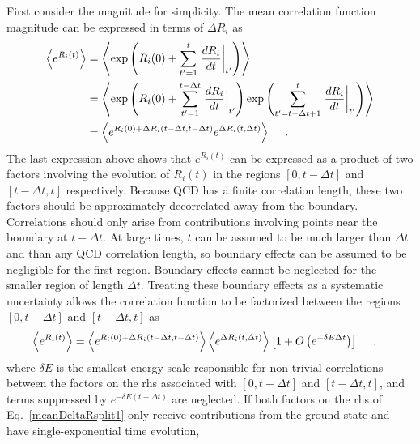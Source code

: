 First consider the magnitude for simplicity. 
 The mean correlation function magnitude can be expressed in terms of $\Delta R_i$ as
 \begin{equation}
   \begin{split}
     \left<  e^{R_i(t)}  \right> &= \left<  \exp\left(R_i(0) + \sum_{t^\prime = 1}^{t} \left.\frac{dR_i}{dt}\right|_{t^\prime} \right) \right>\\
     &= \left<  \exp\left(R_i(0) +  \sum_{t^\prime = 1}^{t - \Delta t} \left.\frac{dR_i}{dt}\right|_{t^\prime} \right) \exp\left( \sum_{t^\prime = t- \Delta t + 1}^{t} \left.\frac{dR_i}{dt}\right|_{t^\prime} \right)  \right> \\
     &= \left<  e^{R_i(0) + \Delta R_i(t - \Delta t, t - \Delta t)}  e^{\Delta R_i(t, \Delta t)}   \right>
     \ \ \ \   .
   \end{split}
   \label{meanDeltaR}
 \end{equation}
 The last expression above shows that $e^{R_i(t)}$ can be expressed as a product of two factors involving the
 evolution of $R_i(t)$ in the regions $[0, t-\Delta t]$ and $[t-\Delta t, t]$ respectively. 
 Because QCD has a finite correlation length, these two factors should be approximately decorrelated away from the boundary.
 Correlations should only arise from contributions involving points near the boundary at $t- \Delta t$.
 At large times, $t$ can be assumed to be much larger than $\Delta t$ and than any QCD correlation length,
 so boundary effects can be assumed to be negligible for the first region.
 Boundary effects cannot be neglected for the smaller region of length $\Delta t$.
 Treating these boundary effects as a systematic uncertainty allows the correlation function
 to be factorized between the regions $[0, t-\Delta t]$ and $[t-\Delta t, t]$ as
 \begin{equation}
   \begin{split}
     \left<  e^{R_i(t)}  \right> &= \left<  e^{R_i(0) + \Delta R_i(t - \Delta t, t - \Delta t)} \right>  \left< e^{ \Delta R_i(t, \Delta t) }  \right> 
     \left[ 1   + O\left( e^{-\delta E \Delta t} \right) \right]
     \ \ \ \  .
   \end{split}
   \label{meanDeltaRsplit1}
 \end{equation}
  where $\delta E$ is the smallest energy scale responsible for non-trivial correlations between the factors on the rhs associated with $[0,t-\Delta t]$ and $[t-\Delta t, t]$, and terms suppressed by $e^{-\delta E(t-\Delta t)}$ are neglected.
  If both factors on the rhs of Eq.~\eqref{meanDeltaRsplit1} only receive contributions from the ground state and have single-exponential time evolution,

